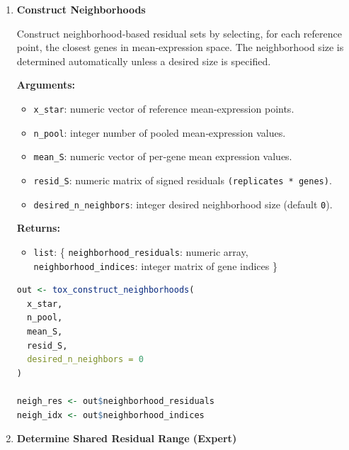\begin{enumerate}
        \begin{lstlisting}[language=R, caption={Pooling Means (Expert Interface)}]
out <- tox_pool_means_expert(
  pooled_means,
  pooled_perm,
  n_points
)

n_pool <- out$n_pool
x_star <- out$x_star
        \end{lstlisting}

    \item \textbf{Construct Neighborhoods}

        Construct neighborhood‑based residual sets by selecting, for each reference point, the closest genes in mean‑expression space.  
        The neighborhood size is determined automatically unless a desired size is specified.

        \textbf{Arguments:}
        \begin{itemize}
            \item \lstinline!x_star!: numeric vector of reference mean‑expression points.
            \item \lstinline!n_pool!: integer number of pooled mean‑expression values.
            \item \lstinline!mean_S!: numeric vector of per‑gene mean expression values.
            \item \lstinline!resid_S!: numeric matrix of signed residuals \lstinline!(replicates * genes)!.
            \item \lstinline!desired_n_neighbors!: integer desired neighborhood size (default \lstinline!0!).
        \end{itemize}

        \textbf{Returns:}
        \begin{itemize}
            \item \lstinline!list!: \{
                \lstinline!neighborhood_residuals!: numeric array,\\
                \lstinline!neighborhood_indices!: integer matrix of gene indices
            \}
        \end{itemize}

        \begin{lstlisting}[language=R, caption={Neighborhood Construction}]
out <- tox_construct_neighborhoods(
  x_star,
  n_pool,
  mean_S,
  resid_S,
  desired_n_neighbors = 0
)

neigh_res <- out$neighborhood_residuals
neigh_idx <- out$neighborhood_indices
        \end{lstlisting}

    \item \textbf{Determine Shared Residual Range (Expert)}


\end{enumerate}
